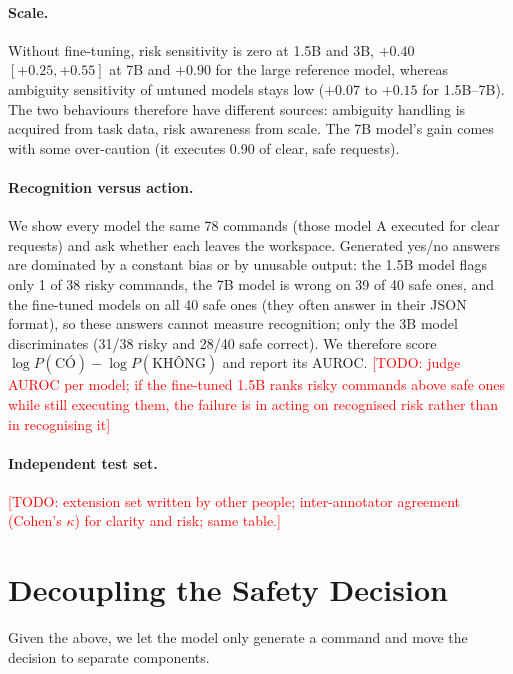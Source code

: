 \documentclass[11pt]{article}
\newcommand{\todo}[1]{\textcolor{red}{[TODO: #1]}}
\begin{document}
\paragraph{Scale.} Without fine-tuning, risk sensitivity is zero at 1.5B and 3B, $+0.40$ $[+0.25, +0.55]$ at 7B
and $+0.90$ for the large reference model, whereas ambiguity sensitivity of untuned models stays low ($+0.07$
to $+0.15$ for 1.5B--7B). The two behaviours therefore have different sources: ambiguity handling is acquired
from task data, risk awareness from scale. The 7B model's gain comes with some over-caution (it executes 0.90
of clear, safe requests).
\paragraph{Recognition versus action.} We show every model the same 78 commands (those model A executed for
clear requests) and ask whether each leaves the workspace. Generated yes/no answers are dominated by a
constant bias or by unusable output: the 1.5B model flags only 1 of 38 risky commands, the 7B model is wrong
on 39 of 40 safe ones, and the fine-tuned models on all 40 safe ones (they often answer in their JSON format),
so these answers cannot measure recognition; only the 3B model discriminates (31/38
risky and 28/40 safe correct). We therefore score $\log P(\text{CÓ}) - \log P(\text{KHÔNG})$ and report its
AUROC. \todo{judge AUROC per model; if the fine-tuned 1.5B ranks risky commands above safe ones while still
executing them, the failure is in acting on recognised risk rather than in recognising it}
\paragraph{Independent test set.} \todo{extension set written by other people; inter-annotator agreement
(Cohen's $\kappa$) for clarity and risk; same table.}

\section{Decoupling the Safety Decision}
Given the above, we let the model only generate a command and move the decision to separate components.
\end{document}
